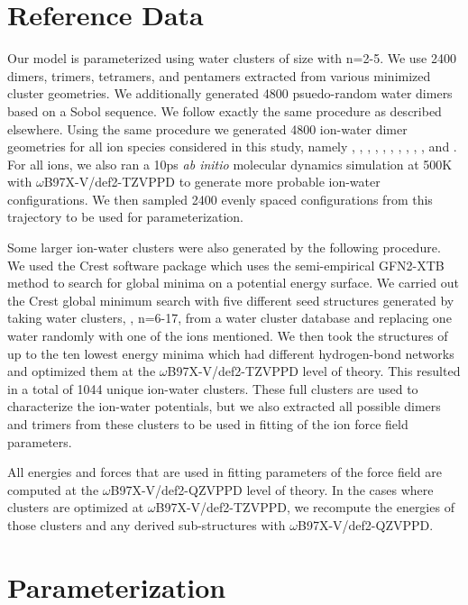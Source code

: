 \documentclass[journal=jacsat,manuscript=article]{achemso}
\begin{document}
\section*{Reference Data}

Our model is parameterized using water clusters of size  with n=2-5.
We use 2400 dimers, trimers, tetramers, and pentamers extracted from various minimized
cluster geometries. We additionally generated 4800 psuedo-random water dimers
based on a Sobol sequence. We follow exactly the same procedure as described elsewhere.\cite{misquitta2008first}
Using the same procedure we generated 4800 ion-water dimer geometries for all ion species considered in this study,
namely , , , , , , , , , , and .
For all ions, we also ran a 10ps \textit{ab initio} molecular dynamics simulation
at 500K with $\omega$B97X-V/def2-TZVPPD to generate more probable ion-water configurations. We then sampled 2400 evenly spaced
configurations from this trajectory to be used for parameterization.

Some larger ion-water clusters were also generated by the following procedure.
We used the Crest software package\cite{pracht2020automated} which uses the semi-empirical GFN2-XTB\cite{bannwarth2019gfn2}
method to search for global minima on a potential energy surface. We carried out the Crest global minimum
search with five different seed structures generated by taking water clusters, , n=6-17, from a
water cluster database\cite{rakshit2019atlas} and replacing one water randomly with one of the ions mentioned.
We then took the structures of up to the ten lowest energy minima which had different hydrogen-bond
networks and optimized them at the $\omega$B97X-V/def2-TZVPPD level of theory. This resulted in a total
of 1044 unique ion-water clusters. These full clusters
are used to characterize the ion-water potentials, but we also extracted all possible dimers
and trimers from these clusters to be used in fitting of the ion force field parameters.

All energies and forces that are used in fitting parameters of the force field are computed
at the $\omega$B97X-V/def2-QZVPPD level of theory. In the cases where clusters are optimized at
$\omega$B97X-V/def2-TZVPPD, we recompute the energies of those clusters and any derived sub-structures
with $\omega$B97X-V/def2-QZVPPD.

\section*{Parameterization}
\end{document}
